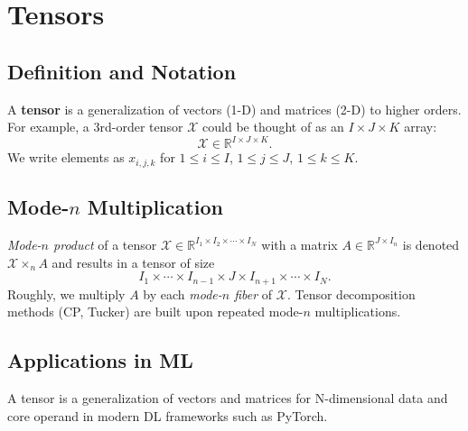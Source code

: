 \section{Tensors}
\subsection{Definition and Notation}
A \textbf{tensor} is a generalization of vectors (1-D) and matrices (2-D) to higher orders. 
For example, a 3rd-order tensor $\mathcal{X}$ could be thought of as an $I \times J \times K$ array:
\[
\mathcal{X} \in \mathbb{R}^{I \times J \times K}.
\]
We write elements as $x_{i,j,k}$ for $1 \le i \le I$, $1 \le j \le J$, $1 \le k \le K$.

\subsection{Mode-$n$ Multiplication}
\emph{Mode-$n$ product} of a tensor $\mathcal{X} \in \mathbb{R}^{I_1 \times I_2 \times \cdots \times I_N}$ 
with a matrix $A \in \mathbb{R}^{J \times I_n}$ is denoted $\mathcal{X} \times_n A$ and 
results in a tensor of size 
\[
I_1 \times \cdots \times I_{n-1} \times J \times I_{n+1} \times \cdots \times I_N.
\]
Roughly, we multiply $A$ by each \emph{mode-$n$ fiber} of $\mathcal{X}$. 
Tensor decomposition methods (CP, Tucker) are built upon repeated mode-$n$ multiplications.

\subsection{Applications in ML}
A tensor is a generalization of vectors and matrices for N-dimensional data and core operand in modern DL frameworks such as PyTorch.